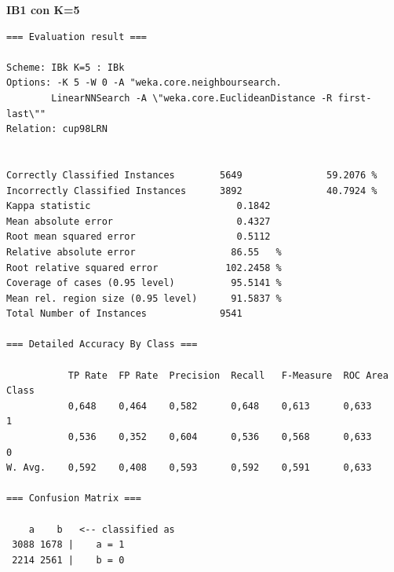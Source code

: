 \textbf{\Large IB1 con K=5}

\begin{verbatim}
=== Evaluation result ===

Scheme: IBk K=5 : IBk
Options: -K 5 -W 0 -A "weka.core.neighboursearch.
		LinearNNSearch -A \"weka.core.EuclideanDistance -R first-last\""
Relation: cup98LRN


Correctly Classified Instances        5649               59.2076 %
Incorrectly Classified Instances      3892               40.7924 %
Kappa statistic                          0.1842
Mean absolute error                      0.4327
Root mean squared error                  0.5112
Relative absolute error                 86.55   %
Root relative squared error            102.2458 %
Coverage of cases (0.95 level)          95.5141 %
Mean rel. region size (0.95 level)      91.5837 %
Total Number of Instances             9541     

=== Detailed Accuracy By Class ===

           TP Rate  FP Rate  Precision  Recall   F-Measure  ROC Area  Class
           0,648    0,464    0,582      0,648    0,613      0,633     1
		   0,536    0,352    0,604      0,536    0,568      0,633     0
W. Avg.    0,592    0,408    0,593      0,592    0,591      0,633     

=== Confusion Matrix ===

    a    b   <-- classified as
 3088 1678 |    a = 1
 2214 2561 |    b = 0
\end{verbatim}